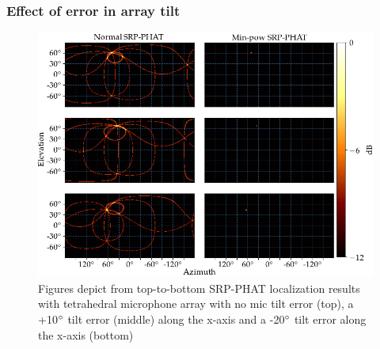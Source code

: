 \subsubsection{Effect of error in array tilt}
\begin{figure}[H]
    \centering
    \includegraphics[width=\textwidth]{Figures/micErrTiltSim.png}
    \caption{Figures depict from top-to-bottom SRP-PHAT localization results with tetrahedral microphone array with no mic tilt error (top), a +10$\degree$ tilt  error (middle) along the x-axis and a -20$\degree$ tilt error along the x-axis (bottom)}
    \label{fig:micErrTilt}
\end{figure}


